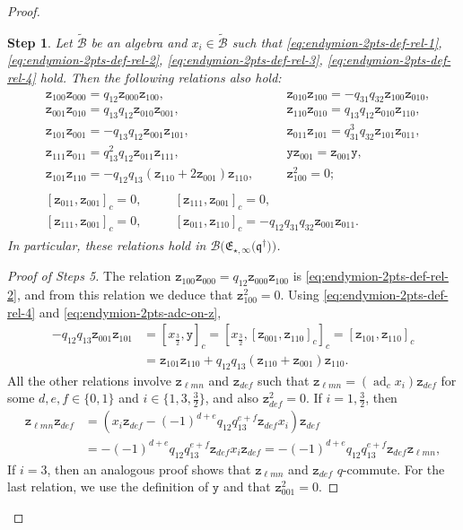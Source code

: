 \documentclass[10pt,a4paper]{amsart}
\numberwithin{equation}{section}
\newtheorem{stepi}{Step}
\newcommand{\adc}{\operatorname{ad}_c}
\newcommand{\toba}{\mathscr B}
\newcommand{\wtoba}{\widetilde{\mathscr B}}
\newcommand{\yt}{\mathtt{y}}
\newcommand{\zt}{\mathtt{z}}
\newcommand{\eny}{\mathfrak{E}}
\newcommand{\enyIIb}[1]{\eny_{\star,#1}}
\newcommand{\bq}{\mathfrak{q}}
\newcommand{\bqs}{\bq^{\dagger}}
\newcommand{\tresdos}{\frac{3}{2}}
\begin{document}
\begin{proof}
\begin{stepi}\label{lem:endymion-2pts-rels-other-1}
Let $\wtoba$ be an algebra and $x_i\in\wtoba$ such that \eqref{eq:endymion-2pts-def-rel-1}, \eqref{eq:endymion-2pts-def-rel-2}, \eqref{eq:endymion-2pts-def-rel-3}, \eqref{eq:endymion-2pts-def-rel-4} hold. Then the following relations also hold:
\begin{gather}\label{eq:q-commut-zs}
\begin{aligned}
&\zt_{100}\zt_{000}=q_{12}\zt_{000}\zt_{100},&&
\zt_{010}\zt_{100} = -q_{31}q_{32}\zt_{100}\zt_{010},
\\
&\zt_{001}\zt_{010} = q_{13}q_{12}\zt_{010}\zt_{001},&&
\zt_{110}\zt_{010} = q_{13}q_{12}\zt_{010}\zt_{110},
\\
&\zt_{101}\zt_{001} = -q_{13}q_{12}\zt_{001}\zt_{101},&&
\zt_{011}\zt_{101} = q_{31}^3q_{32}\zt_{101}\zt_{011},
\\
&\zt_{111}\zt_{011} = q_{13}^2q_{12}\zt_{011}\zt_{111},&&
\yt\zt_{001} = \zt_{001}\yt,
\\
&\zt_{101}\zt_{110} = -q_{12}q_{13}(\zt_{110}+2\zt_{001})\zt_{110},\quad&&
\zt_{100}^2=0;
\end{aligned}
\\ \label{eq:rels-zs}
\begin{aligned}
& [\zt_{011},\zt_{001}]_c=0,\quad&&
[\zt_{111},\zt_{001}]_c=0,
\\
&[\zt_{111},\zt_{001}]_c=0,&&
[\zt_{011},\zt_{110}]_c =-q_{12}q_{31}q_{32}\zt_{001}\zt_{011}.
\end{aligned}
\end{gather}
In particular, these relations hold in $\toba\big(\enyIIb{\infty}\big(\bqs\big) \big)$.
\end{stepi}

\begin{proof}[Proof of Steps 5]
The relation $\zt_{100}\zt_{000}=q_{12}\zt_{000}\zt_{100}$ is \eqref{eq:endymion-2pts-def-rel-2}, and from this relation we deduce that $\zt_{100}^2=0$. Using \eqref{eq:endymion-2pts-def-rel-4} and \eqref{eq:endymion-2pts-adc-on-z},
\begin{align*}
-q_{12}q_{13}\zt_{001}\zt_{101} &= [x_{\tresdos}, \yt]_c = [x_{\tresdos}, [\zt_{001}, \zt_{110}]_c]_c
= [\zt_{101}, \zt_{110}]_c
\\
&= \zt_{101}\zt_{110}+ q_{12}q_{13}(\zt_{110}+\zt_{001})\zt_{110}.
\end{align*}
All the other relations involve $\zt_{\ell mn}$ and $\zt_{def}$ such that $\zt_{\ell mn}=(\adc x_i)\zt_{def}$ for some $d,e,f\in\{0,1\}$ and $i\in\big\{1,3,\tresdos\big\}$, and also $\zt_{def}^2=0$. If $i=1,\tresdos$, then
\begin{align*}
\zt_{\ell mn}\zt_{def} &= (x_i\zt_{def}-(-1)^{d+e}q_{12}q_{13}^{e+f}\zt_{def}x_i) \zt_{def}
\\
&= -(-1)^{d+e}q_{12}q_{13}^{e+f}\zt_{def}x_i\zt_{def}
= -(-1)^{d+e}q_{12}q_{13}^{e+f}\zt_{def}\zt_{\ell mn},
\end{align*}
If $i=3$, then an analogous proof shows that $\zt_{\ell mn}$ and $\zt_{def}$ $q$-commute. For the last relation, we use the definition of $\yt$ and that $\zt_{001}^2=0$.



\end{proof}
\end{proof}
\end{document}
